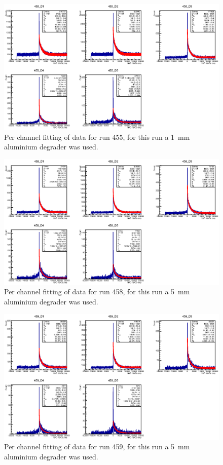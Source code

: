 %
\begin{figure}
    \centering
      \includegraphics[scale=1]{images/momentum_spectrum/455.eps}
    \caption{Per channel fitting of data for run 455, for this run a 1~mm aluminium degrader was used.}
    \label{fig:images_momentum_spectrum_455}
\end{figure}
%
\begin{figure}
    \centering
      \includegraphics[scale=1]{images/momentum_spectrum/458.eps}
    \caption{Per channel fitting of data for run 458, for this run a 5~mm aluminium degrader was used.}
    \label{fig:images_momentum_spectrum_458}
\end{figure}
%
\begin{figure}
    \centering
      \includegraphics[scale=1]{images/momentum_spectrum/459.eps}
    \caption{Per channel fitting of data for run 459, for this run a 5~mm aluminium degrader was used.}
    \label{fig:images_momentum_spectrum_459}
\end{figure}


